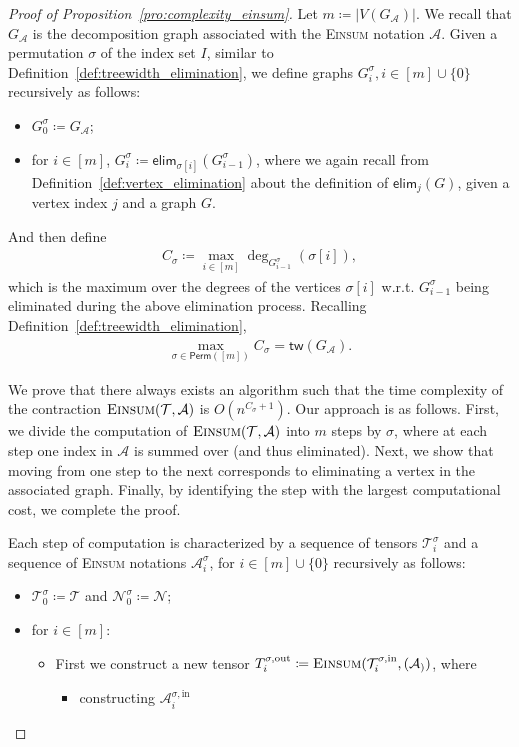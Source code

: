 \documentclass[twoside,11pt]{article}
\def\Einsum{\textsc{Einsum}}
\newcommand{\perm}[1]{\mathsf{Perm}(#1)}
\newcommand{\tensorcontraction}{\textsc{Einsum}}
\newcommand{\degp}[2]{\deg_{#2}(#1)}
\newcommand{\verticesp}[1]{V(#1)}
\newcommand{\treewidthp}[1]{\mathsf{tw}(#1)}
\newcommand{\less}{O}
\newcommand{\eliminatevg}[2]{\mathsf{elim}_{#1}(#2)}
\def\calN{\mathcal{N}}
\def\calA{\mathcal{A}}
\def\calT{\mathcal{T}}
\begin{document}
\iffalse
\begin{proof}[Proof of Proposition~\ref{pro:complexity_einsum}]
Let $m \coloneqq |\verticesp{G_\calA}|$. We recall that $G_{\calA}$ is the decomposition graph associated with the \Einsum{} notation $\calA$. Given a permutation $\sigma$ of the index set $I$, similar to Definition~\ref{def:treewidth_elimination}, we define graphs $G^\sigma_i, i \in [m] \cup \{0\}$ recursively as follows: 
\begin{itemize}
\item $G^\sigma_0 \coloneqq G_\calA$;
\item for $i \in [m]$, $G^\sigma_i \coloneqq \eliminatevg{\sigma[i]}{G^\sigma_{i-1}}$,  
where we again recall from Definition~\ref{def:vertex_elimination} about the definition of $\eliminatevg{j}{G}$, given a vertex index $j$ and a graph $G$.
\end{itemize}
And then define
\begin{align*}
C_\sigma \coloneqq \max_{i\in[m]}\degp{\sigma[i]}{G^\sigma_{i-1}},
\end{align*}
which is the maximum over the degrees of the vertices $\sigma[i]$ w.r.t. $G_{i - 1}^{\sigma}$ being eliminated during the above elimination process. Recalling Definition~\ref{def:treewidth_elimination}, 
\begin{align*}
    \max_{\sigma \in \perm{[m]}}C_\sigma = \treewidthp{G_\calA}. 
\end{align*}

We prove that there always exists an algorithm such that the time complexity of the contraction $\tensorcontraction(\calT, \calA)$ is $\less(n^{C_\sigma + 1})$. Our approach is as follows. First, we divide the computation of $\tensorcontraction(\calT,\calA)$ into $m$ steps by $\sigma$, where at each step one index in $\calA$ is summed over (and thus eliminated). Next, we show that moving from one step to the next corresponds to eliminating a vertex in the associated graph. Finally, by identifying the step with the largest computational cost, we complete the proof.

Each step of computation is characterized by a sequence of tensors $\calT^\sigma_i$ and a sequence of \Einsum{} notations $ \calA^\sigma_i$, for $i \in [m] \cup \{0\}$ recursively as follows:
\begin{itemize}
\item $\calT^\sigma_0 \coloneqq \calT$ and $\calN^\sigma_0 \coloneqq \calN$;

\item for $i \in [m]$:
\begin{itemize}
    \item First we construct a new tensor $T_{i}^{\sigma,\mathrm{out}} \coloneqq \tensorcontraction(\calT_i^{\sigma,\mathrm{in}}, (\calA_))$, where
    \begin{itemize}
        \item constructing $\calA^{\sigma, \mathrm{in}}_i$ 
    \end{itemize}
\end{itemize}
\end{itemize}



\end{proof}
\end{document}

